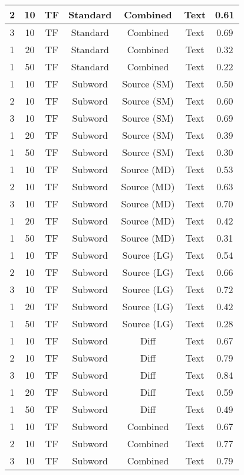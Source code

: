 \begin{longtable}{|c|c|c|c|c|c|c|}
\hline
2 & 10 & TF & Standard & Combined & Text & 0.61 \\
\hline
3 & 10 & TF & Standard & Combined & Text & 0.69 \\
\hline
1 & 20 & TF & Standard & Combined & Text & 0.32 \\
\hline
1 & 50 & TF & Standard & Combined & Text & 0.22 \\
\hline
1 & 10 & TF & Subword & Source (SM) & Text & 0.50 \\
\hline
2 & 10 & TF & Subword & Source (SM) & Text & 0.60 \\
\hline
3 & 10 & TF & Subword & Source (SM) & Text & 0.69 \\
\hline
1 & 20 & TF & Subword & Source (SM) & Text & 0.39 \\
\hline
1 & 50 & TF & Subword & Source (SM) & Text & 0.30 \\
\hline
1 & 10 & TF & Subword & Source (MD) & Text & 0.53 \\
\hline
2 & 10 & TF & Subword & Source (MD) & Text & 0.63 \\
\hline
3 & 10 & TF & Subword & Source (MD) & Text & 0.70 \\
\hline
1 & 20 & TF & Subword & Source (MD) & Text & 0.42 \\
\hline
1 & 50 & TF & Subword & Source (MD) & Text & 0.31 \\
\hline
1 & 10 & TF & Subword & Source (LG) & Text & 0.54 \\
\hline
2 & 10 & TF & Subword & Source (LG) & Text & 0.66 \\
\hline
3 & 10 & TF & Subword & Source (LG) & Text & 0.72 \\
\hline
1 & 20 & TF & Subword & Source (LG) & Text & 0.42 \\
\hline
1 & 50 & TF & Subword & Source (LG) & Text & 0.28 \\
\hline
1 & 10 & TF & Subword & Diff & Text & 0.67 \\
\hline
2 & 10 & TF & Subword & Diff & Text & 0.79 \\
\hline
3 & 10 & TF & Subword & Diff & Text & 0.84 \\
\hline
1 & 20 & TF & Subword & Diff & Text & 0.59 \\
\hline
1 & 50 & TF & Subword & Diff & Text & 0.49 \\
\hline
1 & 10 & TF & Subword & Combined & Text & 0.67 \\
\hline
2 & 10 & TF & Subword & Combined & Text & 0.77 \\
\hline
3 & 10 & TF & Subword & Combined & Text & 0.79 \\

\end{longtable}
